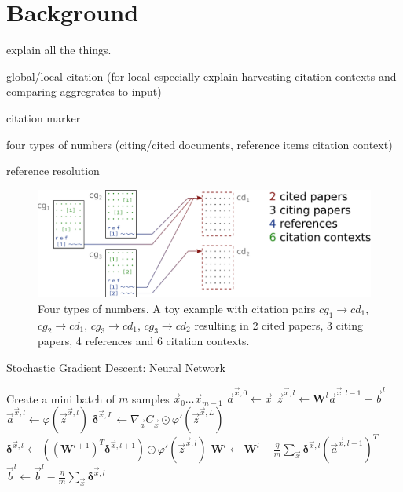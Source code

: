 \chapter{Background}\label{chap:background}
explain all the things.

global/local citation (for local especially explain harvesting citation contexts and comparing aggregrates to input)

citation marker

four types of numbers (citing/cited documents, reference items citation context)

reference resolution

\begin{figure}
  \centering
    \includegraphics[width=\textwidth]{figures/background/four_types_of_numbers_vertsqueeze.pdf}
  \caption[Four types of numbers.]{Four types of numbers. A toy example with citation pairs $cg_1\rightarrow cd_1$, $cg_2\rightarrow cd_1$, $cg_3\rightarrow cd_1$, $cg_3\rightarrow cd_2$ resulting in 2 cited papers, 3 citing papers, 4 references and 6 citation contexts.}
  \label{fig:fournumbers}
\end{figure}

\begin{algorithm}[p]
\caption{Stochastic Gradient Descent: Neural Network}
\label{alg:backpropnn}
\begin{algorithmic}
    \State Create a mini batch of $m$ samples $\vec{x}_0 \ldots \vec{x}_{m-1}$
        \State $\vec{a}^{\vec{x},0} \gets \vec{x}$  
          
            \State $\vec{z}^{\vec{x},l} \gets \mathbf{W}^l \vec{a}^{\vec{x},l-1}+\vec{b}^l$
            \State $\vec{a}^{\vec{x},l} \gets \varphi(\vec{z}^{\vec{x},l})$
        \EndFor
        \State $\bm{\delta}^{\vec{x},L} \gets \nabla_{\vec{a}} C_\vec{x} \odot \varphi'(\vec{z}^{\vec{x},L})$ 
          
            \State $\bm{\delta}^{\vec{x},l} \gets ((\mathbf{W}^{l+1})^T \bm{\delta}^{\vec{x},l+1})\odot \varphi'(\vec{z}^{\vec{x},l})$
        \EndFor
    \EndFor
     
        \State $ \mathbf{W}^l \gets \mathbf{W}^l-\frac{\eta}{m} \sum_\vec{x} \bm{\delta}^{\vec{x},l} (\vec{a}^{\vec{x},l-1})^T$
        \State $\vec{b}^l \gets \vec{b}^l-\frac{\eta}{m}\sum_\vec{x} \bm{\delta}^{\vec{x},l}$
    \EndFor
\end{algorithmic}
\end{algorithm}
